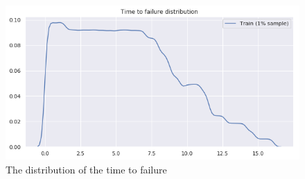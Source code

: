 \documentclass[]{llncs} %
\begin{document}
\begin{figure}
	\centering
	\includegraphics[width=.9\linewidth]{timeToFailureDistribution}
	\caption{The distribution of the time to failure}
	\label{fig:timeToFailureDistribution}
\end{figure}
\clearpage
\newpage
\end{document}
